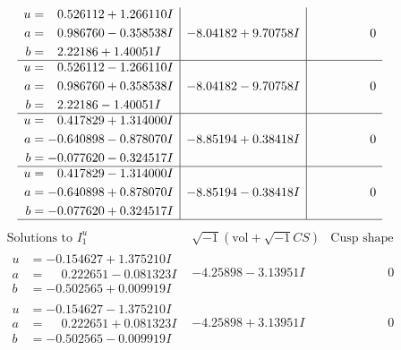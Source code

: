 \documentclass[1p]{elsarticle_modified}
\theoremstyle{definition}
\newcommand{\I}{\sqrt{-1}}
\begin{document}
$$\begin{array}{c|c|c}
\begin{aligned}
u &= \phantom{-}0.526112 + 1.266110 I \\
a &= \phantom{-}0.986760 - 0.358538 I \\
b &= \phantom{-}2.22186 + 1.40051 I\end{aligned}
 & -8.04182 + 9.70758 I & \phantom{-0.000000 } 0 \\ \hline\begin{aligned}
u &= \phantom{-}0.526112 - 1.266110 I \\
a &= \phantom{-}0.986760 + 0.358538 I \\
b &= \phantom{-}2.22186 - 1.40051 I\end{aligned}
 & -8.04182 - 9.70758 I & \phantom{-0.000000 } 0 \\ \hline\begin{aligned}
u &= \phantom{-}0.417829 + 1.314000 I \\
a &= -0.640898 - 0.878070 I \\
b &= -0.077620 - 0.324517 I\end{aligned}
 & -8.85194 + 0.38418 I & \phantom{-0.000000 } 0 \\ \hline\begin{aligned}
u &= \phantom{-}0.417829 - 1.314000 I \\
a &= -0.640898 + 0.878070 I \\
b &= -0.077620 + 0.324517 I\end{aligned}
 & -8.85194 - 0.38418 I & \phantom{-0.000000 } 0\\
 \hline 
 \end{array}$$\newpage$$\begin{array}{c|c|c}  
\text{Solutions to }I^u_{1}& \I (\text{vol} + \sqrt{-1}CS) & \text{Cusp shape}\\
 \hline 
\begin{aligned}
u &= -0.154627 + 1.375210 I \\
a &= \phantom{-}0.222651 - 0.081323 I \\
b &= -0.502565 + 0.009919 I\end{aligned}
 & -4.25898 - 3.13951 I & \phantom{-0.000000 } 0 \\ \hline\begin{aligned}
u &= -0.154627 - 1.375210 I \\
a &= \phantom{-}0.222651 + 0.081323 I \\
b &= -0.502565 - 0.009919 I\end{aligned}
 & -4.25898 + 3.13951 I & \phantom{-0.000000 } 0 \\ \hline\begin{aligned}

\end{aligned}
\end{array}$$
\end{document}
